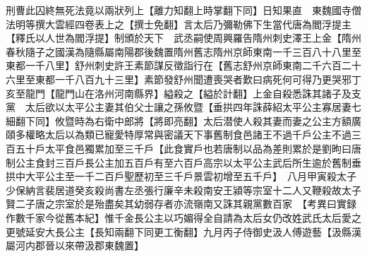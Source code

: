 刑曹此囚終無死法竟以兩狀列上【離力知翻上時掌翻下同】日知果直　東魏國寺僧法明等撰大雲經四卷表上之【撰士免翻】言太后乃彌勒佛下生當代唐為閻浮提主【釋氏以人世為閻浮提】制頒於天下　武丞嗣使周興羅告隋州刺史澤王上金【隋州春秋隨子之國漢為隨縣屬南陽郡後魏置隋州舊志隋州京師東南一千三百八十八里至東都一千八里】舒州刺史許王素節謀反徵詣行在【舊志舒州京師東南二千六百二十六里至東都一千八百九十三里】素節發舒州聞遭喪哭者歎曰病死何可得乃更哭邪丁亥至龍門【龍門山在洛州河南縣界】縊殺之【縊於計翻】上金自殺悉誅其諸子及支黨　太后欲以太平公主妻其伯父士讓之孫攸暨【垂拱四年誅薛紹太平公主寡居妻七細翻下同】攸暨時為右衛中郎將【將即亮翻】太后潜使人殺其妻而妻之公主方額廣頤多權略太后以為類已寵愛特厚常與密議天下事舊制食邑諸王不過千戶公主不過三百五十戶太平食邑獨累加至三千戶【此食實戶也若唐制以品為差則累於是劉昫曰唐制公主食封三百戶長公主加五百戶有至六百戶高宗以太平公主武后所生逾於舊制垂拱中大平公主至一千二百戶聖歷初至三千戶景雲初增至五千戶】　八月甲寅殺太子少保納言裴居道癸亥殺尚書左丞張行廉辛未殺南安王潁等宗室十二人又鞭殺故太子賢二子唐之宗室於是殆盡矣其幼弱存者亦流嶺南又誅其親黨數百家　【考異曰實録作數千家今從舊本紀】惟千金長公主以巧媚得全自請為太后女仍改姓武氏太后愛之更號延安大長公主【長知兩翻下同更工衡翻】九月丙子侍御史汲人傅遊藝【汲縣漢屬河内郡晉以來帶汲郡東魏置】

